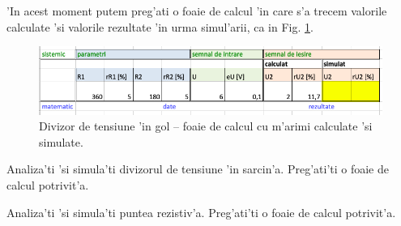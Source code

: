 'In acest moment putem preg'ati o foaie de calcul 'in care s'a trecem valorile calculate 'si valorile rezultate 'in urma simul'arii, ca in Fig. \ref{fig:divizor_tensiune_excel2}.

\begin{figure}[h]
	\centering
	\includegraphics[width=\textwidth]{laborator_01/figuri/divizor_tensiune_excel2}
	\caption{Divizor de tensiune 'in gol -- foaie de calcul cu m'arimi calculate 'si simulate.}
	\label{fig:divizor_tensiune_excel2}
\end{figure}
\begin{exercise}%
  Analiza'ti 'si simula'ti divizorul de tensiune 'in sarcin'a. Preg'ati'ti o foaie de calcul potrivit'a.
\end{exercise}
\begin{exercise}%
  Analiza'ti 'si simula'ti puntea rezistiv'a. Preg'ati'ti o foaie de calcul potrivit'a.
\end{exercise}
